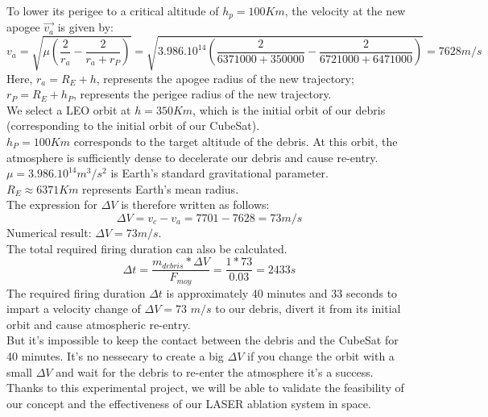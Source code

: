 \begin{itemize}
To lower its perigee to a critical altitude of \textbf{$h_{p}= 100Km$}, the velocity at the new apogee \textbf{$\vec {v_{a}}$} is given by: 
\begin{equation}
  \boxed{  v_{a} = \sqrt {\mu \left(\frac{2}{r_{a}} -\frac{2}{r_{a} + r_{P}}\right )} = \sqrt {3.986.10^{14}\left(\frac{2}{6371000 + 350000} -\frac{2}{6721000 + 6471000}\right )} = 7628 m/s}
\end{equation}
Here, $r_{a} = R_{E} + h$, represents the apogee radius of the new trajectory;\\
$r_{P} = R_{E} + h_{P}$, represents the perigee radius of the new trajectory.\\
We select a LEO orbit at $h = 350Km$, which is the initial orbit of our debris (corresponding to the initial orbit of our CubeSat).\\
$h_{P} = 100Km$ corresponds to the target altitude of the debris. At this orbit, the atmosphere is sufficiently dense to decelerate our debris and cause re-entry. \\
$\mu = 3.986.10^{14} m^{3}/s^{2}$ is Earth's standard gravitational parameter.\\
$R_{E} \approx 6371 Km$ represents Earth's mean radius.\\
The expression for $\Delta V$ is therefore written as follows: 
\begin{equation}
    \boxed{\Delta V = v_{c} - v_{a} = 7701 -7628 = 73m/s}
\end{equation}
Numerical result: $\boxed{\Delta V = 73  m/s}$.\\
The total required firing duration can also be calculated. \\
\begin{equation}
    \boxed{\Delta t = \frac{m_{debris} * \Delta V}{F_{moy}} = \frac{1* 73}{0.03} = 2433 s }
\end{equation}
The required firing duration $\Delta t $ is approximately $40$ minutes and $33$ seconds to impart a velocity change of $\Delta V = 73$ $m/s$ to our debris,
divert it from its initial orbit and cause atmospheric re-entry. \cite{Vallado2013}\\

But it's impossible to keep the contact between the debris and the CubeSat for 40 minutes.
It's no nessecary to create a big $\Delta V$ if you change the orbit with a small $\Delta V$ and wait for the debris to re-enter the atmosphere it's a success.
Thanks to this experimental project, we will be able to validate the feasibility of our concept and the effectiveness of our LASER ablation system in space.

\end{itemize}
